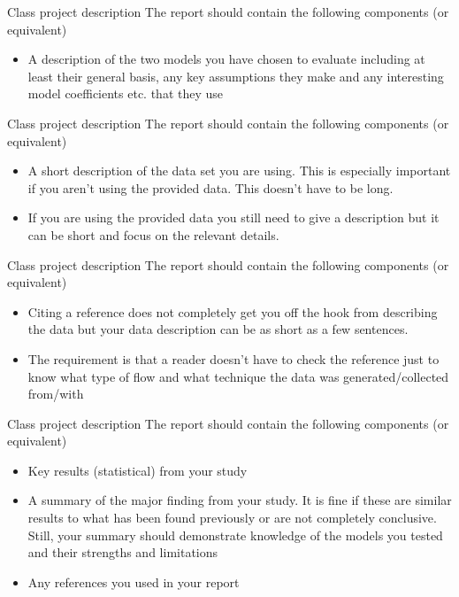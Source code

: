 \begin{frame}{Class project description}
The report should contain the following components (or equivalent)
\begin{itemize}
	\item A description of the two models you have chosen to evaluate including at least their general basis, any key assumptions they make and any interesting model coefficients etc. that they use
	\end{itemize}
\end{frame}

\begin{frame}{Class project description}
The report should contain the following components (or equivalent)
\begin{itemize}
	\item A short description of the data set you are using.  This is especially important if you aren't using the provided data.  This doesn't have to be long.
	\item If you are using the provided data you still need to give a description but it can be short and focus on the relevant details. 
	\end{itemize}
\end{frame}

\begin{frame}{Class project description}
The report should contain the following components (or equivalent)
\begin{itemize}
	\item Citing a reference does not completely get you off the hook from describing the data but your data description can be as short as a few sentences.  
	\item The requirement is that a reader doesn't have to check the reference just to know what type of flow and what technique the data was generated/collected from/with
	\end{itemize}
\end{frame}

\begin{frame}{Class project description}
The report should contain the following components (or equivalent)
\begin{itemize}
	\item Key results (statistical) from your study
	\item  A summary of the major finding from your study.  It is fine if these are similar results to what has been found previously or are not completely conclusive.  Still, your summary should demonstrate knowledge of the models you tested and their strengths and limitations
	\item Any references you used in your report
	\end{itemize}
\end{frame}

